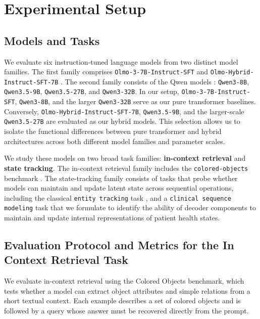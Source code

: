 \documentclass{article}
\begin{document}

\section{Experimental Setup}
\label{sec:exp}

\subsection{Models and Tasks}
\label{sec:models_and_tasks}
We evaluate six instruction-tuned language models from two distinct model families. The first family comprises \texttt{Olmo-3-7B-Instruct-SFT} \citep{olmo2025olmo3} and \texttt{Olmo-Hybrid-Instruct-SFT-7B} \citep{merrill2026olmohybridtheorypractice}. The second family consists of the Qwen models \citep{yang2025qwen3technicalreport}: \texttt{Qwen3-8B}, \texttt{Qwen3.5-9B}, \texttt{Qwen3.5-27B}, and \texttt{Qwen3-32B}. In our setup, \texttt{Olmo-3-7B-Instruct-SFT}, \texttt{Qwen3-8B}, and the larger \texttt{Qwen3-32B} serve as our pure transformer baselines. Conversely, \texttt{Olmo-Hybrid-Instruct-SFT-7B}, \texttt{Qwen3.5-9B}, and the larger-scale \texttt{Qwen3.5-27B} are evaluated as our hybrid models. This selection allows us to isolate the functional differences between pure transformer and hybrid architectures across both different model families and parameter scales.

We study these models on two broad task families: \textbf{in-context retrieval} and \textbf{state tracking}. The in-context retrieval family includes the \texttt{colored-objects} benchmark \citep{srivastava2023beyond}.
The state-tracking family consists of tasks that probe whether models can maintain and update latent state across sequential operations, including the classical \texttt{entity tracking} task \citep{kim-schuster-2023-entity}, and a \texttt
{clinical sequence modeling} task \citep{wang2026handlinginterpretingmissingmodalities} that we formulate to identify the ability of decoder components to maintain and update internal representations of patient health states.

\subsection{Evaluation Protocol and Metrics for the In Context Retrieval Task}\label{sec:eval}
We evaluate in-context retrieval using the Colored Objects benchmark, which tests whether a model can extract object attributes and simple relations from a short textual context. Each example describes a set of colored objects and is followed by a query whose answer must be recovered directly from the prompt. 
\end{document}
